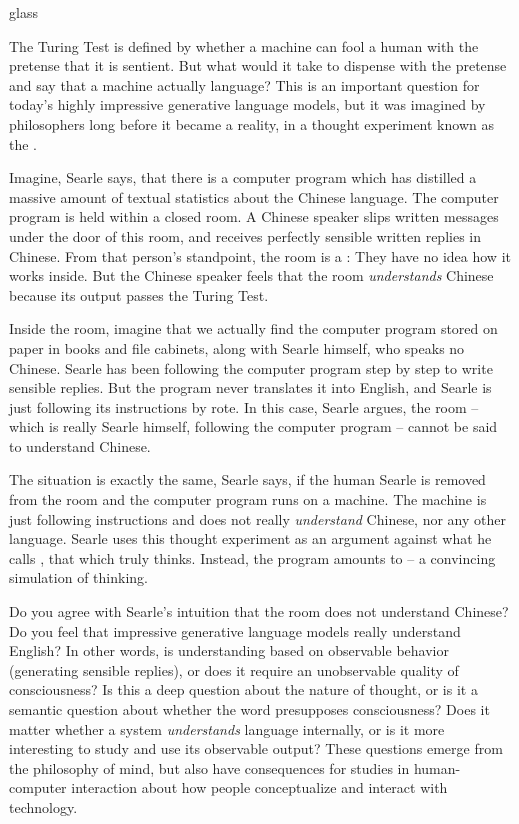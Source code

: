 \begin{underthehood}
\begin{tblsfilledsymbol}{}{glass}

The Turing Test is defined by whether a machine can fool a human with the pretense that it is sentient.  But what would it take to dispense with the pretense and say that a machine actually  language? This is an important question for today's highly impressive generative language models, but it was imagined by philosophers long before it became a reality, in a thought experiment known as the   \citep{Searle:1980}. 

Imagine, Searle says, that there is a computer program which has distilled a massive amount of textual statistics about the Chinese language.  The computer program is held within a closed room.  A Chinese speaker slips written messages under the door of this room, and receives perfectly sensible written replies in  Chinese.  From that person's standpoint, the room is a : They have no idea how it works inside.  But the Chinese speaker feels that the room \emph{understands} Chinese because its output passes the Turing Test.  

Inside the room, imagine that we actually find the computer program stored on paper in books and file cabinets, along with  Searle himself, who speaks no Chinese. Searle has been following the computer program step by step to write sensible replies.  But the program never translates it into English, and Searle is just following its instructions by rote.  In this case, Searle argues, the room -- which is really Searle himself, following the computer program -- cannot be said to understand Chinese.

The situation is exactly the same, Searle says, if the human Searle is removed from the room and the computer program runs on a machine. The machine is just following instructions and does not really \emph{understand} Chinese, nor any other language.  Searle uses this thought experiment as an argument against what he calls , that which truly thinks. Instead, the program amounts to  -- a convincing simulation of thinking. 

Do you agree with Searle's intuition that the room does not understand Chinese?  Do you feel that impressive generative language models really understand English? In other words, is understanding based on observable behavior (generating sensible replies), or does it require an unobservable quality of consciousness?  Is this a deep question about the nature of thought, or is it a semantic question about whether the word  presupposes consciousness? Does it matter whether a system \emph{understands} language internally, or is it more interesting to study and use its observable output? These questions emerge from the philosophy of mind, but also have consequences for studies in human-computer interaction about how people conceptualize and interact with technology. 





\end{tblsfilledsymbol}
\end{underthehood}

